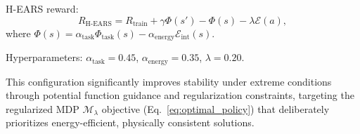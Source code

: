 \documentclass[journal]{IEEEtran}
\begin{document}
	H-EARS reward:
	\begin{equation}
		R_{\text{H-EARS}} = R_{\text{train}} + \gamma\Phi(s') - \Phi(s) - \lambda\mathcal{E}(a),
	\end{equation}
	where $\Phi(s) = \alpha_{\text{task}}\Phi_{\text{task}}(s) - \alpha_{\text{energy}}\mathcal{E}_{\text{int}}(s)$.
	
	Hyperparameters: $\alpha_{\text{task}}=0.45$, $\alpha_{\text{energy}}=0.35$, $\lambda=0.20$.
	
	This configuration significantly improves stability under extreme conditions through potential function guidance and regularization constraints, targeting the regularized MDP $\mathcal{M}_\lambda$ objective (Eq.~\eqref{eq:optimal_policy}) that deliberately prioritizes energy-efficient, physically consistent solutions.
	
\end{document}
